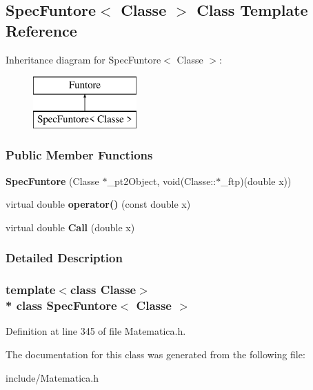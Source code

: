 \hypertarget{classSpecFuntore}{}\subsection{Spec\+Funtore$<$ Classe $>$ Class Template Reference}
\label{classSpecFuntore}
Inheritance diagram for Spec\+Funtore$<$ Classe $>$\+:\begin{figure}[H]
\begin{center}
\leavevmode
\includegraphics[height=2.000000cm]{classSpecFuntore}
\end{center}
\end{figure}
\subsubsection*{Public Member Functions}
\begin{DoxyCompactItemize}
\item 
{\bfseries Spec\+Funtore} (Classe $\ast$\+\_\+pt2\+Object, void(Classe\+::$\ast$\+\_\+ftp)(double x))\hypertarget{classSpecFuntore_aa876c38dd3e977523349978219f78810}{}\label{classSpecFuntore_aa876c38dd3e977523349978219f78810}

\item 
virtual double {\bfseries operator()} (const double x)\hypertarget{classSpecFuntore_ad1b56a9087ec7ac49e01550c4db05cf9}{}\label{classSpecFuntore_ad1b56a9087ec7ac49e01550c4db05cf9}

\item 
virtual double {\bfseries Call} (double x)\hypertarget{classSpecFuntore_a38eee419ace8dfb106b346696cc54510}{}\label{classSpecFuntore_a38eee419ace8dfb106b346696cc54510}

\end{DoxyCompactItemize}


\subsubsection{Detailed Description}
\subsubsection*{template$<$class Classe$>$\\*
class Spec\+Funtore$<$ Classe $>$}



Definition at line 345 of file Matematica.\+h.



The documentation for this class was generated from the following file\+:\begin{DoxyCompactItemize}
\item 
include/Matematica.\+h\end{DoxyCompactItemize}
